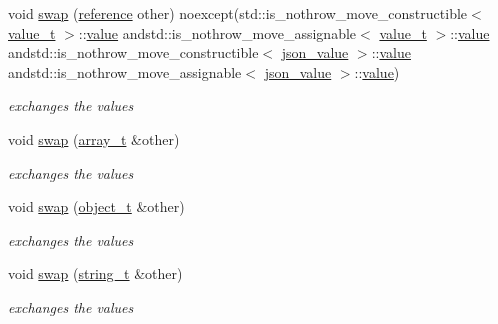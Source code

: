 \begin{DoxyCompactItemize}
void \hyperlink{classnlohmann_1_1basic__json_a66d4de311f79f2fe640793ab7a178781}{swap} (\hyperlink{classnlohmann_1_1basic__json_ac6a5eddd156c776ac75ff54cfe54a5bc}{reference} other) noexcept(std\+::is\+\_\+nothrow\+\_\+move\+\_\+constructible$<$ \hyperlink{namespacenlohmann_1_1detail_a1ed8fc6239da25abcaf681d30ace4985}{value\+\_\+t} $>$\+::\hyperlink{classnlohmann_1_1basic__json_a404017aa52714a0a4bc79d5af7e4ad2b}{value} andstd\+::is\+\_\+nothrow\+\_\+move\+\_\+assignable$<$ \hyperlink{namespacenlohmann_1_1detail_a1ed8fc6239da25abcaf681d30ace4985}{value\+\_\+t} $>$\+::\hyperlink{classnlohmann_1_1basic__json_a404017aa52714a0a4bc79d5af7e4ad2b}{value} andstd\+::is\+\_\+nothrow\+\_\+move\+\_\+constructible$<$ \hyperlink{unionnlohmann_1_1basic__json_1_1json__value}{json\+\_\+value} $>$\+::\hyperlink{classnlohmann_1_1basic__json_a404017aa52714a0a4bc79d5af7e4ad2b}{value} andstd\+::is\+\_\+nothrow\+\_\+move\+\_\+assignable$<$ \hyperlink{unionnlohmann_1_1basic__json_1_1json__value}{json\+\_\+value} $>$\+::\hyperlink{classnlohmann_1_1basic__json_a404017aa52714a0a4bc79d5af7e4ad2b}{value})
\begin{DoxyCompactList}\small\item\em exchanges the values \end{DoxyCompactList}\item 
void \hyperlink{classnlohmann_1_1basic__json_a65b0a24e1361a030ad0a661de22f6c8e}{swap} (\hyperlink{classnlohmann_1_1basic__json_a4c409f1b6d9caf3412c78af9a5883fed}{array\+\_\+t} \&other)
\begin{DoxyCompactList}\small\item\em exchanges the values \end{DoxyCompactList}\item 
void \hyperlink{classnlohmann_1_1basic__json_ac31f12587d2f1a3be5ffc394aa9d72a4}{swap} (\hyperlink{classnlohmann_1_1basic__json_a0322396ca5cd4623bc816bf735377623}{object\+\_\+t} \&other)
\begin{DoxyCompactList}\small\item\em exchanges the values \end{DoxyCompactList}\item 
void \hyperlink{classnlohmann_1_1basic__json_adaa1ed0a889d86c8e0216a3d66980f76}{swap} (\hyperlink{classnlohmann_1_1basic__json_a61f8566a1a85a424c7266fb531dca005}{string\+\_\+t} \&other)
\begin{DoxyCompactList}\small\item\em exchanges the values \end{DoxyCompactList}\end{DoxyCompactItemize}
